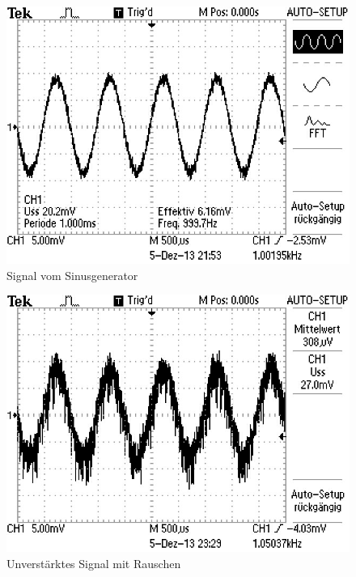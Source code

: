 \documentclass[11pt]{article}
\begin{document}
\begin{figure}[h]
\centering
\includegraphics[scale=0.85]{Bilder/1-sine.png}
\caption{Signal vom Sinusgenerator}
\label{Abb1}
\end{figure}
\begin{figure}[h]
\centering
\includegraphics[scale=0.85]{Bilder/2-noise.png}
\caption{Unverstärktes Signal mit Rauschen}
\label{Abb2}
\end{figure}
\end{document}
